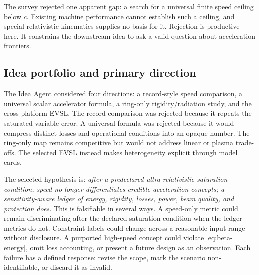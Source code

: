 \documentclass[conference]{../../../../Conference-LaTeX-template_10-17-19/IEEEtran}
\begin{document}
The survey rejected one apparent gap: a search for a universal finite speed ceiling below $c$. Existing machine performance cannot establish such a ceiling, and special-relativistic kinematics supplies no basis for it. Rejection is productive here. It constrains the downstream idea to ask a valid question about acceleration frontiers.

\subsection{Idea portfolio and primary direction}
The Idea Agent considered four directions: a record-style speed comparison, a universal scalar accelerator formula, a ring-only rigidity/radiation study, and the cross-platform EVSL. The record comparison was rejected because it repeats the saturated-variable error. A universal formula was rejected because it would compress distinct losses and operational conditions into an opaque number. The ring-only map remains competitive but would not address linear or plasma trade-offs. The selected EVSL instead makes heterogeneity explicit through model cards.

The selected hypothesis is: \emph{after a predeclared ultra-relativistic saturation condition, speed no longer differentiates credible acceleration concepts; a sensitivity-aware ledger of energy, rigidity, losses, power, beam quality, and protection does.} This is falsifiable in several ways. A speed-only metric could remain discriminating after the declared saturation condition when the ledger metrics do not. Constraint labels could change across a reasonable input range without disclosure. A purported high-speed concept could violate \eqref{eq:beta-energy}, omit loss accounting, or present a future design as an observation. Each failure has a defined response: revise the scope, mark the scenario non-identifiable, or discard it as invalid.
\end{document}
